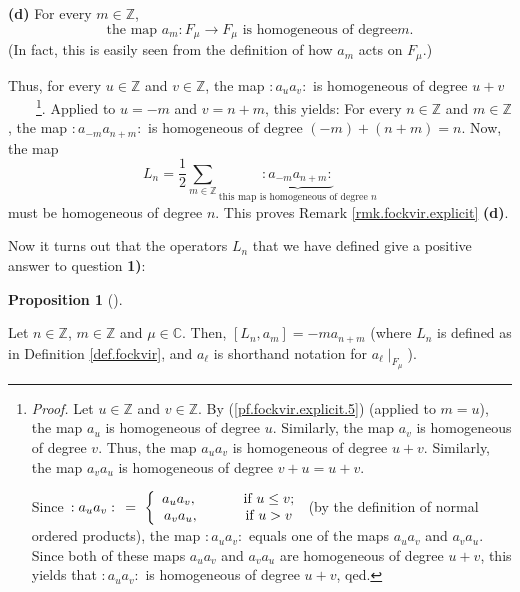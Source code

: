 \documentclass
[numbers=enddot,12pt,final,onecolumn,german,notitlepage]{scrartcl}%
\theoremstyle{definition}
\newtheorem{prop}[theo]{Proposition}
\newenvironment{proposition}[1][]
{\begin{prop}[#1]\begin{leftbar}}
{\end{leftbar}\end{prop}}
\begin{document}
\textbf{(d)} For every $m\in\mathbb{Z}$,%
\begin{equation}
\text{the map }a_{m}:F_{\mu}\rightarrow F_{\mu}\text{ is homogeneous of degree
}m\text{.} \label{pf.fockvir.explicit.5}%
\end{equation}
(In fact, this is easily seen from the definition of how $a_{m}$ acts on
$F_{\mu}$.)

Thus, for every $u\in\mathbb{Z}$ and $v\in\mathbb{Z}$, the map $\left.
:a_{u}a_{v}:\right.  $ is homogeneous of degree $u+v$%
\ \ \ \ \footnote{\textit{Proof.} Let $u\in\mathbb{Z}$ and $v\in\mathbb{Z}$.
By (\ref{pf.fockvir.explicit.5}) (applied to $m=u$), the map $a_{u}$ is
homogeneous of degree $u$. Similarly, the map $a_{v}$ is homogeneous of degree
$v$. Thus, the map $a_{u}a_{v}$ is homogeneous of degree $u+v$. Similarly, the
map $a_{v}a_{u}$ is homogeneous of degree $v+u=u+v$.
\par
Since $\left.  :a_{u}a_{v}:\right.  \ =\ \left\{
\begin{array}
[c]{c}%
a_{u}a_{v},\ \ \ \ \ \ \ \ \ \ \text{if }u\leq v;\\
a_{v}a_{u},\ \ \ \ \ \ \ \ \ \ \text{if }u>v
\end{array}
\right.  $ (by the definition of normal ordered products), the map $\left.
:a_{u}a_{v}:\right.  $ equals one of the maps $a_{u}a_{v}$ and $a_{v}a_{u}$.
Since both of these maps $a_{u}a_{v}$ and $a_{v}a_{u}$ are homogeneous of
degree $u+v$, this yields that $\left.  :a_{u}a_{v}:\right.  $ is homogeneous
of degree $u+v$, qed.}. Applied to $u=-m$ and $v=n+m$, this yields: For every
$n\in\mathbb{Z}$ and $m\in\mathbb{Z}$, the map $\left.  :a_{-m}a_{n+m}%
:\right.  $ is homogeneous of degree $\left(  -m\right)  +\left(  n+m\right)
=n$. Now, the map%
\[
L_{n}=\dfrac{1}{2}\sum\limits_{m\in\mathbb{Z}}\underbrace{\left.
:a_{-m}a_{n+m}:\right.  }_{\text{this map is homogeneous of degree }n}%
\]
must be homogeneous of degree $n$. This proves Remark
\ref{rmk.fockvir.explicit} \textbf{(d)}.

Now it turns out that the operators $L_{n}$ that we have defined give a
positive answer to question \textbf{1)}:

\begin{proposition}
\label{prop.fockvir.answer1}Let $n\in\mathbb{Z}$, $m\in\mathbb{Z}$ and $\mu
\in\mathbb{C}$. Then, $\left[  L_{n},a_{m}\right]  =-ma_{n+m}$ (where $L_{n}$
is defined as in Definition \ref{def.fockvir}, and $a_{\ell}$ is shorthand
notation for $a_{\ell}\mid_{F_{\mu}}$).
\end{proposition}
\end{document}
